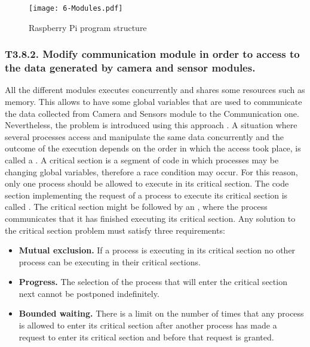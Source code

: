 \begin{figure}[!h]
	\begin{center}
		\texttt{[image: 6-Modules.pdf]}
		\caption{Raspberry Pi program structure}
		\label{fig:6-Modules}
	\end{center}
\end{figure}


\subsubsection{T3.8.2. Modify communication module in order to access to the data generated by camera and sensor modules.}
All the different modules executes concurrently and shares some resources such as memory. This allows to have some global variables that are used to communicate the data collected from Camera and Sensors module to the Communication one. Nevertheless, the  problem is introduced using this approach \cite{SGG06}. A situation where several processes access and manipulate the same data concurrently and the outcome of the execution depends on the order in which the access took place, is called a . A critical section is a segment of code in which processes may be changing global variables, therefore a race condition may occur. For this reason, only one process should be allowed to execute in its critical section. The code section implementing the request of a process to execute its critical section is called . The critical section might be followed by an , where the process communicates that it has finished executing its critical section. Any solution to the critical section problem must satisfy three requirements:
\begin{itemize}
	\item \textbf{Mutual exclusion.} If a process is executing in its critical section no other process can be executing in their critical sections.
	\item \textbf{Progress.} The selection of the process that will enter the critical section next cannot be postponed indefinitely.
	\item \textbf{Bounded waiting.} There is a limit on the number of times that any process is allowed to enter its critical section after another process has made a request to enter its critical section and before that request is granted.
\end{itemize}

